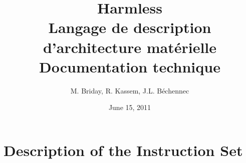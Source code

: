 \documentclass[11pt]{book}
\title{Harmless \\Langage de description d'architecture matérielle \\ Documentation technique}
\author{M. Briday, R. Kassem, J.L. Béchennec}
\date{June 15, 2011} %
\begin{document}
\maketitle
\tableofcontents


\part{Description of the Instruction Set} 





%
%


%

\appendix
%

\end{document}
